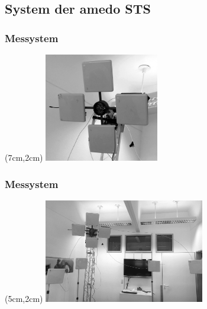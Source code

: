 \subsection{System der amedo STS}
\begin{frame}
  \frametitle{Messystem}
	\begin{textblock*}{5cm}(7cm,2cm) %
  		\includegraphics[width=5cm]{../img/4AntennaSetup_small.png}
  	\end{textblock*}
\end{frame}
\begin{frame}
  \frametitle{Messystem}
	\begin{textblock*}{7cm}(5cm,2cm) %
  		\includegraphics[width=7cm]{../img/RFID-Okto.png}
  	\end{textblock*}
\end{frame}
